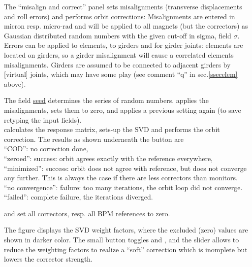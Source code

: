 \documentclass[12pt]{article}
\newcommand\button[1]{\fbox{\small\bf #1}}
\newcommand\field[1]{\underline{\small #1}}
\begin{document}
The ``misalign and correct'' panel sets misalignments (transverse displacements and roll errors) and performs orbit corrections:
Misalignments are entered in micron resp. micro-rad and will be applied to all magnets (but the correctors) as Gaussian distributed random numbers with the given cut-off in sigma, field \field{$\sigma$}.
Errors can be applied to elements, to girders and for girder joints: 
elements are located on girders, so a girder misalignment will cause a correlated elements misalignments. Girders are assumed to be connected to adjacent girders  by [virtual] joints, which may have some play (see comment ``q'' in sec.\ref{ssecelem} above).

The field \field{seed} determines the series of random numbers. 
\button{set} applies the misalignments, \button{zero} sets them to zero,
and \button{re-set} applies a previous setting again (to save retyping the input fields).\\

\button{correct} calculates the response matrix, sets-up the SVD and performs the orbit correction. The results as shown underneath the button are \\
``COD'': no correction done, \\
``zeroed'': success: orbit agrees exactly with the reference everywhere,\\
``minimized'': success: orbit does not agree with reference, but does not converge any further. This is always the case if there are less correctors than monitors.\\
``no convergence'': failure: too many iterations, the orbit loop did not converge.\\
``failed'': complete failure, the iterations diverged.

\button{Corr=0} and \button{BPM=0} set all correctors, resp. all BPM references to zero.


The figure displays the SVD weight factors, where the excluded (zero) values are shown in darker color. The small button toggles \button{X} and \button{Y}, and the slider allows to reduce the weighting factors to realize a ``soft'' correction which is inomplete but lowers the corrector strength.
\end{document}
